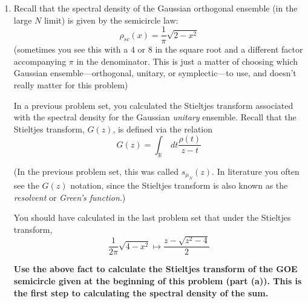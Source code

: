 \documentclass[a4paper]{article}
\begin{document}
\begin{enumerate}[label=(\alph*)]
\item Recall that the spectral density of the Gaussian orthogonal ensemble (in the large $N$ limit) is given by the semicircle law:
\begin{equation}
    \rho_{sc}(x) = \frac{1}{\pi}\sqrt{2-x^2}
\end{equation}
(sometimes you see this  with a $4$ or $8$ in the square root and a different factor accompanying $\pi$ in the denominator.  This is just a matter of choosing which Gaussian ensemble---orthogonal, unitary, or symplectic---to use, and doesn't really matter for this problem)

In a previous problem set, you calculated the Stieltjes transform associated with the spectral density for the Gaussian \emph{unitary} ensemble.  Recall that the Stieltjes transform, $G(z)$, is defined via the relation
\begin{equation}
     G(z) = \int_\mathbb{R}~dt \frac{\rho(t)}{z - t}
\end{equation}

(In the previous problem set, this was called $s_{\mu_N}(z)$.  In literature you often see the $G(z)$ notation, since the Stieltjes transform is also known as the \emph{resolvent} or \emph{Green's function}.)

You should have calculated in the last problem set that under the Stieltjes transform, 
\begin{equation}
    \frac{1}{2\pi}\sqrt{4-x^2} \mapsto \frac{z - \sqrt{z^2 - 4}}{2}
\end{equation}

\textbf{Use the above fact to calculate the Stieltjes transform of the GOE semicircle given at the beginning of this problem (part (a)).  This is the first step to calculating the spectral density of the sum.}


\end{enumerate}
\end{document}
